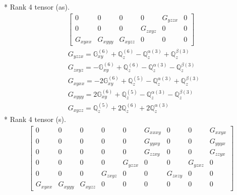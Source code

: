 \documentclass[fleqn,8pt,landscape]{jsarticle}
\begin{document}
* Rank 4 tensor (as).
\begin{align*}
\begin{bmatrix} 0 & 0 & 0 & 0 & G_{yzzx} & 0 \\ 0 & 0 & 0 & G_{zxyz} & 0 & 0 \\ G_{xyxx} & G_{xyyy} & G_{xyzz} & 0 & 0 & 0 \end{bmatrix}
\end{align*}
\begin{align*}
& G_{yzzx} = \mathbb{G}_{xy}^{(6)} + \mathbb{Q}_{z}^{(6)} - \mathbb{Q}_{z}^{\alpha(3)} + \mathbb{Q}_{z}^{\beta(3)} \\
& G_{zxyz} = - \mathbb{G}_{xy}^{(6)} + \mathbb{Q}_{z}^{(6)} - \mathbb{Q}_{z}^{\alpha(3)} - \mathbb{Q}_{z}^{\beta(3)} \\
& G_{xyxx} = - 2 \mathbb{G}_{xy}^{(6)} + \mathbb{Q}_{z}^{(5)} - \mathbb{Q}_{z}^{\alpha(3)} + \mathbb{Q}_{z}^{\beta(3)} \\
& G_{xyyy} = 2 \mathbb{G}_{xy}^{(6)} + \mathbb{Q}_{z}^{(5)} - \mathbb{Q}_{z}^{\alpha(3)} - \mathbb{Q}_{z}^{\beta(3)} \\
& G_{xyzz} = \mathbb{Q}_{z}^{(5)} + 2 \mathbb{Q}_{z}^{(6)} + 2 \mathbb{Q}_{z}^{\alpha(3)}
\end{align*}
* Rank 4 tensor (s).
\begin{align*}
\begin{bmatrix} 0 & 0 & 0 & 0 & 0 & G_{xxxy} & 0 & 0 & G_{xxyx} \\ 0 & 0 & 0 & 0 & 0 & G_{yyxy} & 0 & 0 & G_{yyyx} \\ 0 & 0 & 0 & 0 & 0 & G_{zzxy} & 0 & 0 & G_{zzyx} \\ 0 & 0 & 0 & 0 & G_{yzzx} & 0 & 0 & G_{yzxz} & 0 \\ 0 & 0 & 0 & G_{zxyz} & 0 & 0 & G_{zxzy} & 0 & 0 \\ G_{xyxx} & G_{xyyy} & G_{xyzz} & 0 & 0 & 0 & 0 & 0 & 0 \end{bmatrix}
\end{align*}
\end{document}
